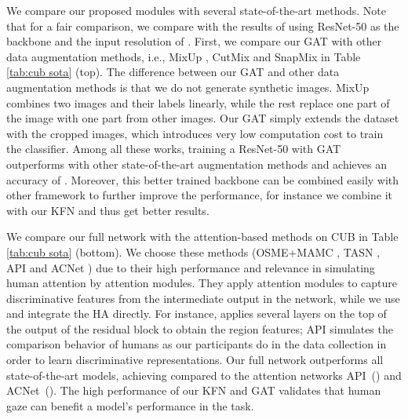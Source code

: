 \documentclass{bmvc2k}
\begin{document}
We compare our proposed modules with several state-of-the-art methods. Note that for a fair comparison, we compare with the results of using ResNet-50 as the backbone and the input resolution of . First, we compare our GAT with other data augmentation methods, i.e., MixUp \cite{zhang2017mixup}, CutMix \cite{yun2019cutmix} and SnapMix \cite{huang2020snapmix} in Table \ref{tab:cub sota} (top). 
The difference between our GAT and other data augmentation methods is that we do not generate synthetic images. MixUp combines two images and their labels linearly, while the rest replace one part of the image with one part from other images. Our GAT simply extends the dataset with the cropped images, which introduces very low computation cost to train the classifier. Among all these works, training a ResNet-50 with GAT outperforms with other state-of-the-art augmentation methods and achieves an accuracy of . Moreover, this better trained backbone can be combined easily with other framework to further improve the performance, for instance we combine it with our KFN and thus get better results. 




\begin{table}[b]
\vspace{-0.3cm}
\begin{center}
\end{center}
\caption{Combining our GAT model with the state-of-the-art methods on CUB.}
\label{tab:combi}
\end{table}

We compare our full network with the attention-based methods on CUB in Table \ref{tab:cub sota} (bottom). We choose these methods (OSME+MAMC \cite{sun2018multi}, TASN \cite{zheng2019looking}, API \cite{zhuang2020learning} and ACNet \cite{ji2020attention}) due to their high performance and relevance in simulating human attention by attention modules. They apply attention modules to capture discriminative features from the intermediate output in the network, while we use and integrate the HA directly. 
For instance, \cite{sun2018multi,ji2020attention} applies several layers on the top of the output of the residual block to obtain the region features; API \cite{zhuang2020learning} simulates the comparison behavior of humans as our participants do in the data collection in order to learn discriminative representations. 
Our full network outperforms all state-of-the-art models, achieving  compared to the attention networks API~() and ACNet~(). The high performance of our KFN and GAT validates that human gaze can benefit a model's performance in the task.
\end{document}
